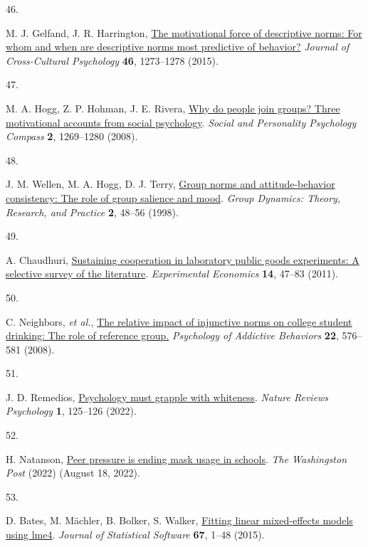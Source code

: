 \documentclass[
  man, donotrepeattitle,floatsintext]{apa6}
\newlength{\cslhangindent}
\newlength{\csllabelwidth}
\newlength{\cslentryspacingunit} %
\newenvironment{CSLReferences}[2] %
 {%
  \setlength{\parindent}{0pt}
  \ifodd #1
  \let\oldpar\par
  \def\par{\hangindent=\cslhangindent\oldpar}
  \fi
  \setlength{\parskip}{#2\cslentryspacingunit}
 }%
 {}
\newcommand{\CSLLeftMargin}[1]{\parbox[t]{\csllabelwidth}{#1}}
\newcommand{\CSLRightInline}[1]{\parbox[t]{\linewidth - \csllabelwidth}{#1}\break}
\begin{document}
\begin{CSLReferences}{0}{0}
\leavevmode{}%
\CSLLeftMargin{46. }%
\CSLRightInline{M. J. Gelfand, J. R. Harrington, \href{https://doi.org/10.1177/0022022115600796}{The motivational force of descriptive norms: For whom and when are descriptive norms most predictive of behavior?} \emph{Journal of Cross-Cultural Psychology} \textbf{46}, 1273--1278 (2015).}

\leavevmode{}%
\CSLLeftMargin{47. }%
\CSLRightInline{M. A. Hogg, Z. P. Hohman, J. E. Rivera, \href{https://doi.org/10.1111/j.1751-9004.2008.00099.x}{Why do people join groups? Three motivational accounts from social psychology}. \emph{Social and Personality Psychology Compass} \textbf{2}, 1269--1280 (2008).}

\leavevmode{}%
\CSLLeftMargin{48. }%
\CSLRightInline{J. M. Wellen, M. A. Hogg, D. J. Terry, \href{https://doi.org/10.1037/1089-2699.2.1.48}{Group norms and attitude-behavior consistency: The role of group salience and mood}. \emph{Group Dynamics: Theory, Research, and Practice} \textbf{2}, 48--56 (1998).}

\leavevmode{}%
\CSLLeftMargin{49. }%
\CSLRightInline{A. Chaudhuri, \href{https://doi.org/10.1007/s10683-010-9257-1}{Sustaining cooperation in laboratory public goods experiments: A selective survey of the literature}. \emph{Experimental Economics} \textbf{14}, 47--83 (2011).}

\leavevmode{}%
\CSLLeftMargin{50. }%
\CSLRightInline{C. Neighbors, \emph{et al.}, \href{https://doi.org/10.1037/a0013043}{The relative impact of injunctive norms on college student drinking: The role of reference group.} \emph{Psychology of Addictive Behaviors} \textbf{22}, 576--581 (2008).}

\leavevmode{}%
\CSLLeftMargin{51. }%
\CSLRightInline{J. D. Remedios, \href{https://doi.org/10.1038/s44159-022-00024-4}{Psychology must grapple with whiteness}. \emph{Nature Reviews Psychology} \textbf{1}, 125--126 (2022).}

\leavevmode{}%
\CSLLeftMargin{52. }%
\CSLRightInline{H. Natanson, \href{https://www.washingtonpost.com/education/2022/02/25/peer-pressure-mask-optional-schools/}{Peer pressure is ending mask usage in schools}. \emph{The Washingston Post} (2022) (August 18, 2022).}

\leavevmode{}%
\CSLLeftMargin{53. }%
\CSLRightInline{D. Bates, M. Mächler, B. Bolker, S. Walker, \href{https://doi.org/10.18637/jss.v067.i01}{Fitting linear mixed-effects models using lme4}. \emph{Journal of Statistical Software} \textbf{67}, 1--48 (2015).}


\end{CSLReferences}
\end{document}
